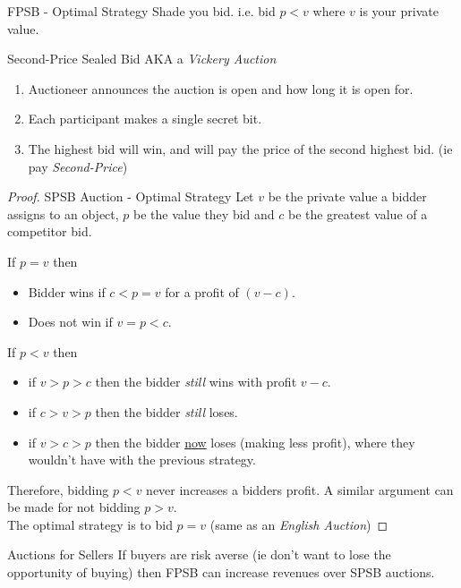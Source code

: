 \documentclass[11pt,a4paper]{article}
\begin{document}
\begin{proposition}{FPSB - Optimal Strategy}
  Shade you bid. i.e. bid $p<v$ where $v$ is your private value.
\end{proposition}

\begin{definition}{Second-Price Sealed Bid}
  AKA a \textit{Vickery Auction}
  \begin{enumerate}
    \item Auctioneer announces the auction is open and how long it is open for.
    \item Each participant makes a single secret bit.
    \item The highest bid will win, and will pay the price of the second highest bid. (ie pay \textit{Second-Price})
  \end{enumerate}
\end{definition}

\begin{proof}{SPSB Auction - Optimal Strategy}
  Let $v$ be the private value a bidder assigns to an object, $p$ be the value they bid and $c$ be the greatest value of a competitor bid.
  \par If $p=v$ then
  \begin{itemize}
    \item Bidder wins if $c<p=v$ for a profit of $(v-c)$.
    \item Does not win if $v=p<c$.
  \end{itemize}
  If $p<v$ then
  \begin{itemize}
    \item if $v>p>c$ then the bidder \textit{still} wins with profit $v-c$.
    \item if $c>v>p$ then the bidder \textit{still} loses.
    \item if $v>c>p$ then the bidder \underline{now} loses (making less profit), where they wouldn't have with the previous strategy.
  \end{itemize}
  Therefore, bidding $p<v$ never increases a bidders profit. A similar argument can be made for not bidding $p>v$.\\
  The optimal strategy is to bid $p=v$ (same as an \textit{English Auction})
\end{proof}

\begin{remark}{Auctions for Sellers}
  If buyers are risk averse (ie don't want to lose the opportunity of buying) then FPSB can increase revenues over SPSB auctions.
\end{remark}
\end{document}
